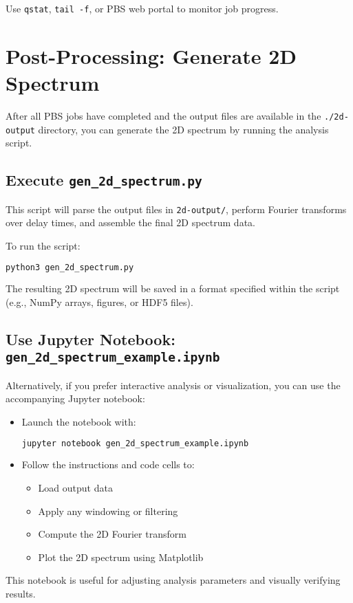 \documentclass{article}
\begin{document}
Use \texttt{qstat}, \texttt{tail -f}, or PBS web portal to monitor job progress.

\section{Post-Processing: Generate 2D Spectrum}

After all PBS jobs have completed and the output files are available in the \texttt{./2d-output} directory, you can generate the 2D spectrum by running the analysis script.

\subsection*{Execute \texttt{gen\_2d\_spectrum.py}}

This script will parse the output files in \texttt{2d-output/}, perform Fourier transforms over delay times, and assemble the final 2D spectrum data.

To run the script:

\begin{lstlisting}[language=bash]
python3 gen_2d_spectrum.py
\end{lstlisting}

\noindent The resulting 2D spectrum will be saved in a format specified within the script (e.g., NumPy arrays, figures, or HDF5 files).

\subsection*{Use Jupyter Notebook: \texttt{gen\_2d\_spectrum\_example.ipynb}}

Alternatively, if you prefer interactive analysis or visualization, you can use the accompanying Jupyter notebook:

\begin{itemize}
    \item Launch the notebook with:
    \begin{lstlisting}[language=bash]
    jupyter notebook gen_2d_spectrum_example.ipynb
    \end{lstlisting}
    \item Follow the instructions and code cells to:
    \begin{itemize}
        \item Load output data
        \item Apply any windowing or filtering
        \item Compute the 2D Fourier transform
        \item Plot the 2D spectrum using Matplotlib
    \end{itemize}
\end{itemize}

This notebook is useful for adjusting analysis parameters and visually verifying results.
\end{document}
